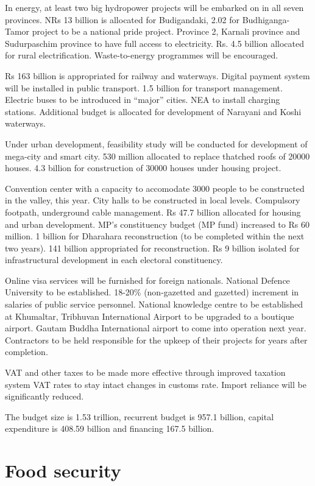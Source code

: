 \documentclass[
]{book}
\begin{document}
In energy, at least two big hydropower projects will be embarked on in all seven provinces. NRs 13 billion is allocated for Budigandaki, 2.02 for Budhiganga-Tamor project to be a national pride project. Province 2, Karnali province and Sudurpaschim province to have full access to electricity. Rs. 4.5 billion allocated for rural electrification. Waste-to-energy programmes will be encouraged.

Rs 163 billion is appropriated for railway and waterways. Digital payment system will be installed in public transport. 1.5 billion for transport management. Electric buses to be introduced in ``major'' cities. NEA to install charging stations. Additional budget is allocated for development of Narayani and Koshi waterways.

Under urban development, feasibility study will be conducted for development of mega-city and smart city. 530 million allocated to replace thatched roofs of 20000 houses. 4.3 billion for construction of 30000 houses under housing project.

Convention center with a capacity to accomodate 3000 people to be constructed in the valley, this year. City halls to be constructed in local levels. Compulsory footpath, underground cable management. Rs 47.7 billion allocated for housing and urban development. MP's constituency budget (MP fund) increased to Rs 60 million. 1 billion for Dharahara reconstruction (to be completed within the next two years). 141 billion appropriated for reconstruction. Rs 9 billion isolated for infrastructural development in each electoral constituency.

Online visa services will be furnished for foreign nationals. National Defence University to be established. 18-20\% (non-gazetted and gazetted) increment in salaries of public service personnel. National knowledge centre to be established at Khumaltar, Tribhuvan International Airport to be upgraded to a boutique airport. Gautam Buddha International airport to come into operation next year. Contractors to be held responsible for the upkeep of their projects for years after completion.

VAT and other taxes to be made more effective through improved taxation system VAT rates to stay intact changes in customs rate. Import reliance will be significantly reduced.

The budget size is 1.53 trillion, recurrent budget is 957.1 billion, capital expenditure is 408.59 billion and financing 167.5 billion.

\hypertarget{food-security}{%
\section{Food security}\label{food-security}}
\end{document}
